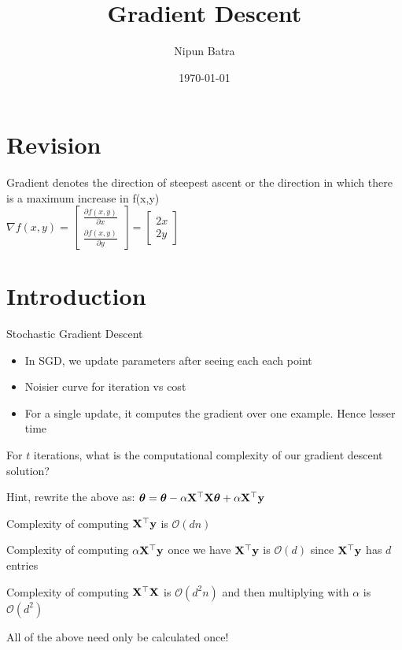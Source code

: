 \documentclass[usenames,dvipsnames]{beamer}
\title{Gradient Descent}
\date{\today}
\author{Nipun Batra}
\institute{IIT Gandhinagar}
\begin{document}
  \maketitle

  \section{Revision}
  \begin{frame}Gradient denotes the direction of steepest ascent or the direction in which there is a maximum increase in f(x,y) \\
\pause $\nabla f(x, y) = \begin{bmatrix}
\frac{\partial f(x, y)}{\partial x}\\
\frac{\partial f(x, y)}{\partial y}
\end{bmatrix} = \begin{bmatrix} 2x\\2y
\end{bmatrix}$

\end{frame}

  \section{Introduction}

  \begin{frame}Stochastic Gradient Descent
                        \begin{itemize}
\item In SGD, we update parameters after seeing each each point
                            \item Noisier curve for iteration vs cost 
                            \pause
\item For a single update, it computes the gradient over one example. Hence lesser time
                        \end{itemize}

                    \end{frame}
                    
                    \begin{frame}For $t$ iterations, what is the computational complexity of our gradient descent solution?

\pause Hint, rewrite the above as: \(\boldsymbol{\theta}=\boldsymbol{\theta} - \alpha \mathbf{X}^{\top}\mathbf{X} \boldsymbol{\theta}+ \alpha \mathbf{X}^{\top}\mathbf{y}\) 

\pause Complexity of computing $\mathbf{X}^{\top}\mathbf{y}$ is $\mathcal{O}(dn)$

\pause Complexity of computing $\alpha \mathbf{X}^{\top}\mathbf{y}$ once we have $\mathbf{X}^{\top}\mathbf{y}$ is $\mathcal{O}(d)$ since $\mathbf{X}^{\top}\mathbf{y}$ has $d$ entries

\pause Complexity of computing $\mathbf{X}^{\top}\mathbf{X}$ is $\mathcal{O}(d^2n)$ and then multiplying with $\alpha$ is $\mathcal{O}(d^2)$

\pause All of the above need only be calculated once!

\end{frame}
\end{document}
